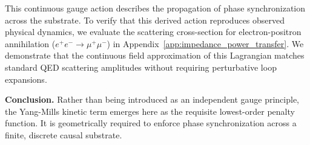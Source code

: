 This continuous gauge action describes the propagation of phase synchronization across the substrate. To verify that this derived action reproduces observed physical dynamics, we evaluate the scattering cross-section for electron-positron annihilation ($e^+e^- \to \mu^+\mu^-$) in Appendix~\ref{app:impedance_power_transfer}. We demonstrate that the continuous field approximation of this Lagrangian matches standard QED scattering amplitudes without requiring perturbative loop expansions.

\textbf{Conclusion.} Rather than being introduced as an independent gauge principle, the Yang-Mills kinetic term emerges here as the requisite lowest-order penalty function. It is geometrically required to enforce phase synchronization across a finite, discrete causal substrate.